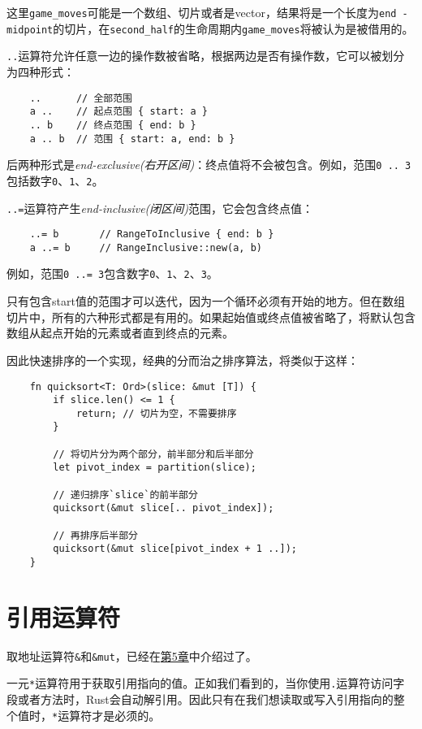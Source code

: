 这里\texttt{game\_moves}可能是一个数组、切片或者是vector，结果将是一个长度为\texttt{end - midpoint}的切片，在\texttt{second\_half}的生命周期内\texttt{game\_moves}将被认为是被借用的。

\texttt{..}运算符允许任意一边的操作数被省略，根据两边是否有操作数，它可以被划分为四种形式：
\begin{verbatim}
    ..      // 全部范围
    a ..    // 起点范围 { start: a }
    .. b    // 终点范围 { end: b }
    a .. b  // 范围 { start: a, end: b }
\end{verbatim}

后两种形式是\emph{end-exclusive(右开区间)}：终点值将不会被包含。例如，范围\texttt{0 .. 3}包括数字\texttt{0}、\texttt{1}、\texttt{2}。

\texttt{..=}运算符产生\emph{end-inclusive(闭区间)}范围，它会包含终点值：
\begin{verbatim}
    ..= b       // RangeToInclusive { end: b }
    a ..= b     // RangeInclusive::new(a, b)
\end{verbatim}

例如，范围\texttt{0 ..= 3}包含数字\texttt{0}、\texttt{1}、\texttt{2}、\texttt{3}。

只有包含start值的范围才可以迭代，因为一个循环必须有开始的地方。但在数组切片中，所有的六种形式都是有用的。如果起始值或终点值被省略了，将默认包含数组从起点开始的元素或者直到终点的元素。

因此快速排序的一个实现，经典的分而治之排序算法，将类似于这样：
\begin{verbatim}
    fn quicksort<T: Ord>(slice: &mut [T]) {
        if slice.len() <= 1 {
            return; // 切片为空，不需要排序
        }

        // 将切片分为两个部分，前半部分和后半部分
        let pivot_index = partition(slice);

        // 递归排序`slice`的前半部分
        quicksort(&mut slice[.. pivot_index]);

        // 再排序后半部分
        quicksort(&mut slice[pivot_index + 1 ..]);
    }
\end{verbatim}

\section{引用运算符}

取地址运算符\texttt{\&}和\texttt{\&mut}，已经在\hyperref[ch05]{第5章}中介绍过了。

一元\texttt{*}运算符用于获取引用指向的值。正如我们看到的，当你使用\texttt{.}运算符访问字段或者方法时，Rust会自动解引用。因此只有在我们想读取或写入引用指向的整个值时，\texttt{*}运算符才是必须的。


